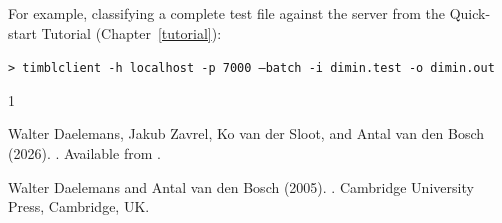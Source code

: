 \documentclass{report}
\begin{document}
For example, classifying a complete test file against the server from
the Quick-start Tutorial (Chapter~\ref{tutorial}):

{\tt > timblclient -h localhost -p 7000 --batch -i dimin.test -o dimin.out}

\clearpage

\begin{thebibliography}{1}

Walter Daelemans, Jakub Zavrel, Ko van der Sloot, and Antal van den
  Bosch (2026).
.
\newblock Available from \timblmanualurl.

Walter Daelemans and Antal van den Bosch (2005).
.
\newblock Cambridge University Press, Cambridge, UK.

\end{thebibliography}
\end{document}
